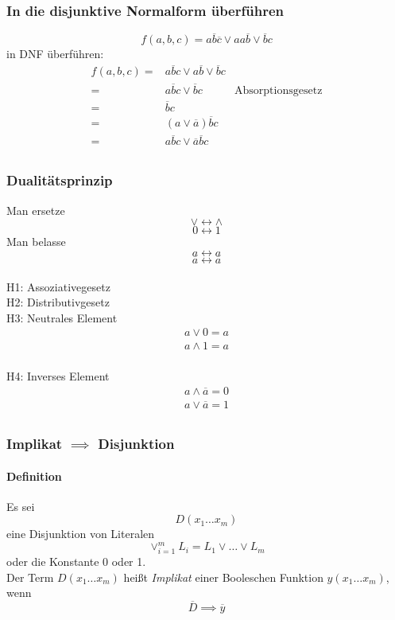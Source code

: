 \documentclass[a4paper]{scrartcl}
\begin{document}
			\subsubsection{In die disjunktive Normalform überführen}
			\[ f(a, b, c) = a \overline{b} \overline{c} \vee aa \overline{b} \vee \overline{b} c \]
			in DNF überführen:\\
			\begin{align*}
				f(a, b, c) =& a \overline{b} c \vee a \overline{b} \vee \overline{b} c \\
				=& a \overline{b} c \vee \overline{b} c & \text{Absorptionsgesetz} \\
				=& \overline{b} c \\
				=& (a \vee \overline{a}) \overline{b} c \\
				=& a  \overline{b} c \vee  \overline{a} \overline{b} c \\
			\end{align*}
			
			\subsubsection{Dualitätsprinzip}
			Man ersetze 
			\[ \vee \leftrightarrow \wedge \]
			\[ 0 \leftrightarrow 1 \]
			Man belasse
			\[ a  \leftrightarrow a \]
			\[ \overline{a} \leftrightarrow \overline{a}  \]\\ 
			H1: Assoziativegesetz\\
			
			H2: Distributivgesetz\\
			
			H3: Neutrales Element
			\begin{align*}
				a \vee 0 = a \\
				a \wedge 1 = a\\
			\end{align*}
			
			H4: Inverses Element
			\begin{align*}
				a \wedge \overline{a} = 0\\
				a \vee \overline{a} = 1 \\
			\end{align*}
			
			\subsubsection{Implikat \( \implies \) Disjunktion }
			\paragraph{Definition}
			Es sei \[D(x_1 \dots x_m)\] eine Disjunktion von Literalen \[ \vee_{i=1}^{m} L_i = L_1 \vee \dots \vee L_m  \]
			oder die Konstante 0 oder 1.\\
			Der Term \(D(x_1 \dots x_m)\) heißt \emph{Implikat} einer Booleschen Funktion \( y( x_1 \dots x_m) \), wenn \[ \overline{D} \implies \overline{y} \]
			
\end{document}

